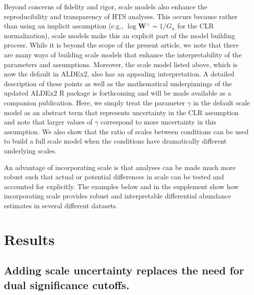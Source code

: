 \documentclass[
]{article}
\begin{document}
Beyond concerns of fidelity and rigor, scale models also enhance the
reproducibility and transparency of HTS analyses. This occurs because
rather than using an implicit assumption (e.g.,
\(\log \mathbf{W}^{\perp}=1/G_{n}\) for the CLR normalization), scale
models make this an explicit part of the model building process. While
it is beyond the scope of the present article, we note that there are
many ways of building scale models that enhance the interpretability of
the parameters and assumptions. Moreover, the scale model listed above,
which is now the default in ALDEx2, also has an appealing
interpretation. A detailed description of these points as well as the
mathematical underpinnings of the updated ALDEx2 R package is
forthcoming and will be made available as a companion publication. Here,
we simply treat the parameter \(\gamma\) in the default scale model as
an abstract term that represents uncertainty in the CLR assumption and
note that larger values of \(\gamma\) correspond to more uncertainty in
this assumption. We also show that the ratio of scales between
conditions can be used to build a full scale model when the conditions
have dramatically different underlying scales.

An advantage of incorporating scale is that analyses can be made much
more robust such that actual or potential differences in scale can be
tested and accounted for explicitly. The examples below and in the
supplement show how incorporating scale provides robust and
interpretable differential abundance estimates in several different
datasets.

\hypertarget{results}{%
\section{Results}\label{results}}

\hypertarget{adding-scale-uncertainty-replaces-the-need-for-dual-significance-cutoffs.}{%
\subsection{Adding scale uncertainty replaces the need for dual
significance
cutoffs.}\label{adding-scale-uncertainty-replaces-the-need-for-dual-significance-cutoffs.}}
\end{document}
